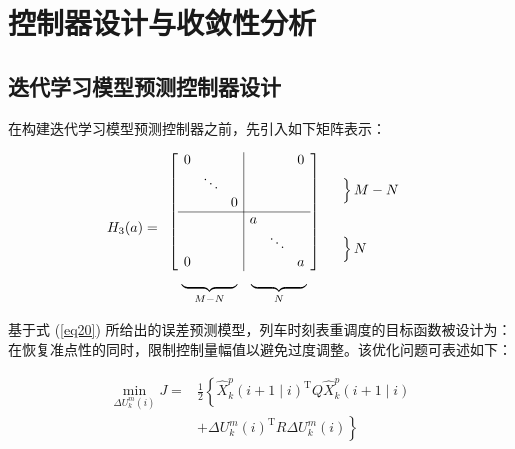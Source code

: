 \section{控制器设计与收敛性分析}
\label{section4}

\subsection{迭代学习模型预测控制器设计}

在构建迭代学习模型预测控制器之前，先引入如下矩阵表示：

\begin{equation*}
    H_{3}(a)=
    \begin{array}{ccccccccccc}
    \setlength{\arraycolsep}{1.5mm}
        \left[
        \begin{array}{ccc|ccc}
           0& & & & & 0 \\
           & \ddots& & & & \\
            &  & 0& & & \\ 
            \cline{1-6}
           & & &a& & \\
            & & & &\ddots& \\
           0& & & & &a\\
        \end{array}
        \right]
        &
        \begin{array}{c}
        	 \\
             \left.\rule{0mm}{3.5mm}\right\}M-N  \\ \hfill
             \\
             \\\left.\rule{0mm}{3.5mm}\right\}N \hfill
             \\
        \end{array} \\
        \begin{array}{cc}
            \underbrace{\rule{14mm}{0mm}}_{M-N}&  
            \underbrace{\rule{14mm}{0mm}}_{N}
        \end{array}
    \end{array}
\end{equation*}

基于式 (\ref{eq20}) 所给出的误差预测模型，列车时刻表重调度的目标函数被设计为：在恢复准点性的同时，限制控制量幅值以避免过度调整。该优化问题可表述如下：

\begin{equation}
\begin{aligned}
\min _{\Delta U_k^m(i)} J= & \frac{1}{2}\left\{ \hat{X}_k^p(i+1 \mid i)^{\mathrm{T}} Q \hat{X}_k^p(i+1 \mid i) \right. \\
& \left. + \Delta U_k^m(i)^{\mathrm{T}} R \Delta U_k^m(i) \right\}
\end{aligned}
\label{eq21}
\end{equation}


